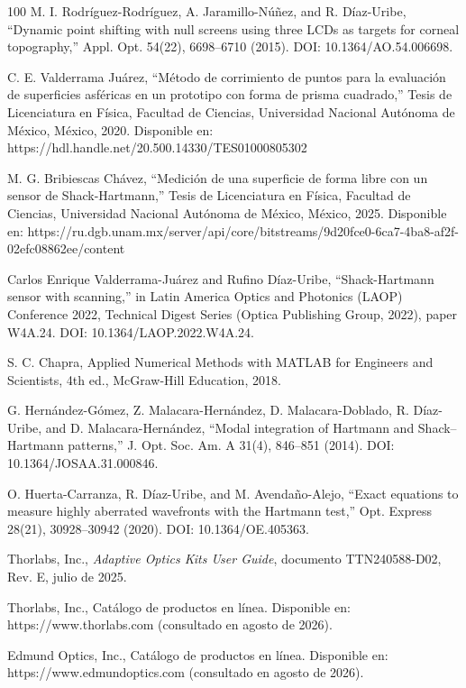 \documentclass[letterpaper,12pt,oneside]{book}
\begin{document}
\begin{thebibliography}{100}
	M. I. Rodríguez-Rodríguez, A. Jaramillo-Núñez, and R. Díaz-Uribe, ``Dynamic point shifting with null screens using three LCDs as targets for corneal topography,'' Appl. Opt. 54(22), 6698--6710 (2015). DOI: 10.1364/AO.54.006698.
	
	C. E. Valderrama Juárez, ``Método de corrimiento de puntos para la evaluación de superficies asféricas en un prototipo con forma de prisma cuadrado,'' Tesis de Licenciatura en Física, Facultad de Ciencias, Universidad Nacional Autónoma de México, México, 2020. Disponible en: https://hdl.handle.net/20.500.14330/TES01000805302

	M. G. Bribiescas Chávez, ``Medición de una superficie de forma libre con un sensor de Shack-Hartmann,'' Tesis de Licenciatura en Física, Facultad de Ciencias, Universidad Nacional Autónoma de México, México, 2025. Disponible en: https://ru.dgb.unam.mx/server/api/core/bitstreams/9d20fce0-6ca7-4ba8-af2f-02efc08862ee/content

	Carlos Enrique Valderrama-Juárez and Rufino Díaz-Uribe, ``Shack-Hartmann sensor with scanning,'' in Latin America Optics and Photonics (LAOP) Conference 2022, Technical Digest Series (Optica Publishing Group, 2022), paper W4A.24. DOI: 10.1364/LAOP.2022.W4A.24.
	
	S. C. Chapra, Applied Numerical Methods with MATLAB for Engineers and Scientists, 4th ed., McGraw-Hill Education, 2018.
	
	G. Hernández-Gómez, Z. Malacara-Hernández, D. Malacara-Doblado, R. Díaz-Uribe, and D. Malacara-Hernández, ``Modal integration of Hartmann and Shack--Hartmann patterns,'' J. Opt. Soc. Am. A 31(4), 846--851 (2014). DOI: 10.1364/JOSAA.31.000846.
	
	O. Huerta-Carranza, R. Díaz-Uribe, and M. Avendaño-Alejo, ``Exact equations to measure highly aberrated wavefronts with the Hartmann test,'' Opt. Express 28(21), 30928--30942 (2020). DOI: 10.1364/OE.405363.

	Thorlabs, Inc., \textit{Adaptive Optics Kits User Guide}, documento TTN240588-D02, Rev. E, julio de 2025.

	Thorlabs, Inc., Catálogo de productos en línea. Disponible en: https://www.thorlabs.com (consultado en agosto de 2026).

	Edmund Optics, Inc., Catálogo de productos en línea. Disponible en: https://www.edmundoptics.com (consultado en agosto de 2026).

\end{thebibliography}
	
\end{document}
